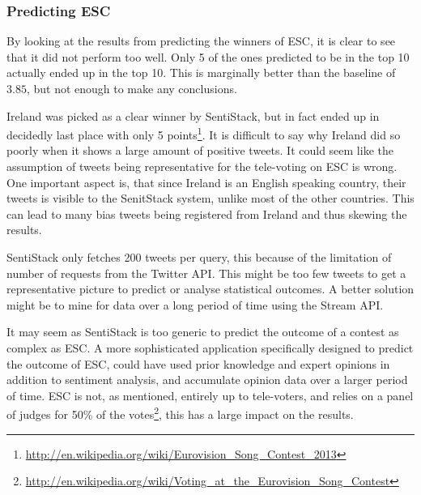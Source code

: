 \subsubsection{Predicting ESC}

By looking at the results from predicting the winners of ESC, it is clear to see that it did not perform too well. Only 5 of the ones predicted to be in the top 10 actually ended up in the top 10. This is marginally better than the baseline of $3.85$, but not enough to make any conclusions. 

Ireland was picked as a clear winner by SentiStack, but in fact ended up in decidedly last place with only 5 points\footnote{\url{http://en.wikipedia.org/wiki/Eurovision_Song_Contest_2013}}. It is difficult to say why Ireland did so poorly when it shows a large amount of positive tweets. It could seem like the assumption of tweets being representative for the tele-voting on ESC is wrong. One important aspect is, that since Ireland is an English speaking country, their tweets is visible to the SenitStack system, unlike most of the other countries. This can lead to many bias tweets being registered from Ireland and thus skewing the results. 

SentiStack only fetches 200 tweets per query, this because of the limitation of number of requests from the Twitter API. This might be too few tweets to get a representative picture to predict or analyse statistical outcomes. A better solution might be to mine for data over a long period of time using the Stream API. 

It may seem as SentiStack is too generic to predict the outcome of a contest as complex as ESC. A more sophisticated application specifically designed to predict the outcome of ESC, could have used prior knowledge and expert opinions in addition to sentiment analysis, and accumulate opinion data over a larger period of time. ESC is not, as mentioned, entirely up to tele-voters, and relies on a panel of judges for 50\% of the votes\footnote{\url{http://en.wikipedia.org/wiki/Voting_at_the_Eurovision_Song_Contest}}, this has a large impact on the results.

